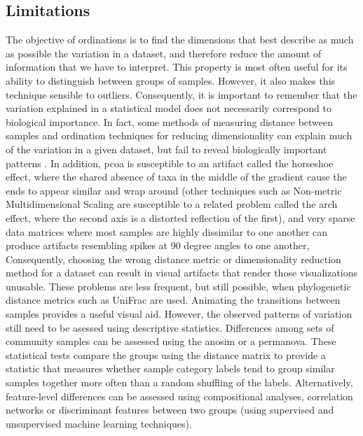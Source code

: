 \subsection{Limitations}
The objective of ordinations is to find the dimensions that best describe as much as possible the variation in a dataset, and therefore reduce the amount of information that we have to interpret. This property is most often useful for its ability to distinguish between groups of samples. However, it also makes this technique sensible to outliers. Consequently, it is important to remember that the variation explained in a statistical model does not necessarily correspond to biological importance. In fact, some methods of measuring distance between samples and ordination techniques for reducing dimensionality can explain much of the variation in a given dataset, but fail to reveal biologically important patterns \cite{RN3802}. In addition, \gls{pcoa} is susceptible to an artifact called the horseshoe effect, where the shared absence of taxa in the middle of the gradient cause the ends to appear similar and wrap around (other techniques such as Non-metric Multidimensional Scaling are susceptible to a related problem called the arch effect, where the second axis is a distorted reflection of the first), and very sparse data matrices where most samples are highly dissimilar to one another can produce artifacts resembling spikes at 90 degree angles to one another, Consequently, choosing the wrong distance metric or dimensionality reduction method for a dataset can result in visual artifacts that render those visualizations unusable. These problems are less frequent, but still possible, when phylogenetic distance metrics such as UniFrac \cite{RN83} are used.
Animating the transitions between samples provides a useful visual aid. However, the observed patterns of variation still need to be asessed using descriptive statistics. Differences among sets of community samples can be assessed using the \gls{anosim} or a \gls{permanova}. These statistical tests compare the groups using the distance matrix to provide a statistic that measures whether sample category labels tend to group similar samples together more often than a random shuffling of the labels. Alternatively, feature-level differences can be assessed using compositional analyses, correlation networks or discriminant features between two groups (using supervised and unsupervised machine learning techniques). 

